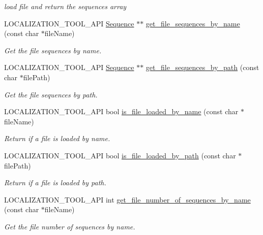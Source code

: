 \begin{DoxyCompactItemize}
\begin{DoxyCompactList}\small\item\em load file and return the sequences array \end{DoxyCompactList}\item 
L\+O\+C\+A\+L\+I\+Z\+A\+T\+I\+O\+N\+\_\+\+T\+O\+O\+L\+\_\+\+A\+PI \mbox{\hyperlink{classprz_1_1_sequence}{Sequence}} $\ast$$\ast$ \mbox{\hyperlink{namespaceprz_a1bf460cd725d36d217e1a94ea659038e}{get\+\_\+file\+\_\+sequences\+\_\+by\+\_\+name}} (const char $\ast$file\+Name)
\begin{DoxyCompactList}\small\item\em Get the file sequences by name. \end{DoxyCompactList}\item 
L\+O\+C\+A\+L\+I\+Z\+A\+T\+I\+O\+N\+\_\+\+T\+O\+O\+L\+\_\+\+A\+PI \mbox{\hyperlink{classprz_1_1_sequence}{Sequence}} $\ast$$\ast$ \mbox{\hyperlink{namespaceprz_ad20f7c7ee778799b88580eaf987b20d3}{get\+\_\+file\+\_\+sequences\+\_\+by\+\_\+path}} (const char $\ast$file\+Path)
\begin{DoxyCompactList}\small\item\em Get the file sequences by path. \end{DoxyCompactList}\item 
L\+O\+C\+A\+L\+I\+Z\+A\+T\+I\+O\+N\+\_\+\+T\+O\+O\+L\+\_\+\+A\+PI bool \mbox{\hyperlink{namespaceprz_a60a210bc0ab0675f0096a17f18420c7b}{is\+\_\+file\+\_\+loaded\+\_\+by\+\_\+name}} (const char $\ast$file\+Name)
\begin{DoxyCompactList}\small\item\em Return if a file is loaded by name. \end{DoxyCompactList}\item 
L\+O\+C\+A\+L\+I\+Z\+A\+T\+I\+O\+N\+\_\+\+T\+O\+O\+L\+\_\+\+A\+PI bool \mbox{\hyperlink{namespaceprz_a70392696dda40f3306dbc887daf79478}{is\+\_\+file\+\_\+loaded\+\_\+by\+\_\+path}} (const char $\ast$file\+Path)
\begin{DoxyCompactList}\small\item\em Return if a file is loaded by path. \end{DoxyCompactList}\item 
L\+O\+C\+A\+L\+I\+Z\+A\+T\+I\+O\+N\+\_\+\+T\+O\+O\+L\+\_\+\+A\+PI int \mbox{\hyperlink{namespaceprz_a1e7f643937e9d287b0ee7b629861e34c}{get\+\_\+file\+\_\+number\+\_\+of\+\_\+sequences\+\_\+by\+\_\+name}} (const char $\ast$file\+Name)
\begin{DoxyCompactList}\small\item\em Get the file number of sequences by name. \end{DoxyCompactList}\item 

\end{DoxyCompactItemize}
